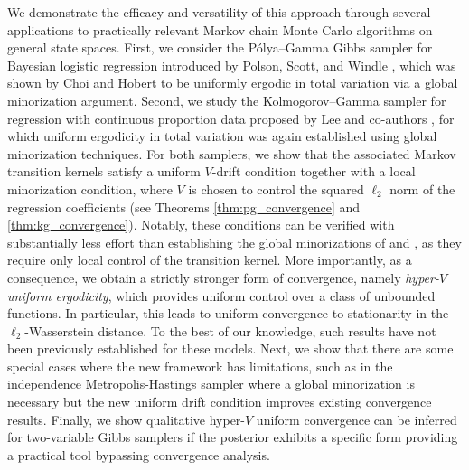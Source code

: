 \documentclass[ejsv2, noshowframe]{imsart}
\theoremstyle{plain}
\theoremstyle{definition}
\theoremstyle{remark}
\begin{document}
We demonstrate the efficacy and versatility of this approach through several applications to practically relevant Markov chain Monte Carlo algorithms on general state spaces. First, we consider the Pólya--Gamma Gibbs sampler for Bayesian logistic regression introduced by Polson, Scott, and Windle \cite{PolsonScottWindle2013}, which was shown by Choi and Hobert \cite{ChoiHobert2013} to be uniformly ergodic in total variation via a global minorization argument. Second, we study the Kolmogorov--Gamma sampler for regression with continuous proportion data proposed by Lee and co-authors \cite{LeeEtAlKG}, for which uniform ergodicity in total variation was again established using global minorization techniques. For both samplers, we show that the associated Markov transition kernels satisfy a uniform $V$-drift condition together with a local minorization condition, where $V$ is chosen to control the squared $\ell_2$ norm of the regression coefficients (see Theorems \ref{thm:pg_convergence} and \ref{thm:kg_convergence}). Notably, these conditions can be verified with substantially less effort than establishing the global minorizations of \cite{ChoiHobert2013} and \cite{LeeEtAlKG}, as they require only local control of the transition kernel. More importantly, as a consequence, we obtain a strictly stronger form of convergence, namely \emph{hyper-$V$ uniform ergodicity}, which provides uniform control over a class of unbounded functions. In particular, this leads to uniform convergence to stationarity in the $\ell_2$-Wasserstein distance. To the best of our knowledge, such results have not been previously established for these models. 
Next, we show that there are some special cases where the new framework has limitations, such as in the independence Metropolis-Hastings sampler \cite{hastings:1970, tierney:1994, RobertCasella2004} where a global minorization is necessary but the new uniform drift condition improves existing convergence results.
Finally, we show qualitative hyper-$V$ uniform convergence can be inferred for two-variable Gibbs samplers if the posterior exhibits a specific form providing a practical tool bypassing convergence analysis. 
\end{document}
